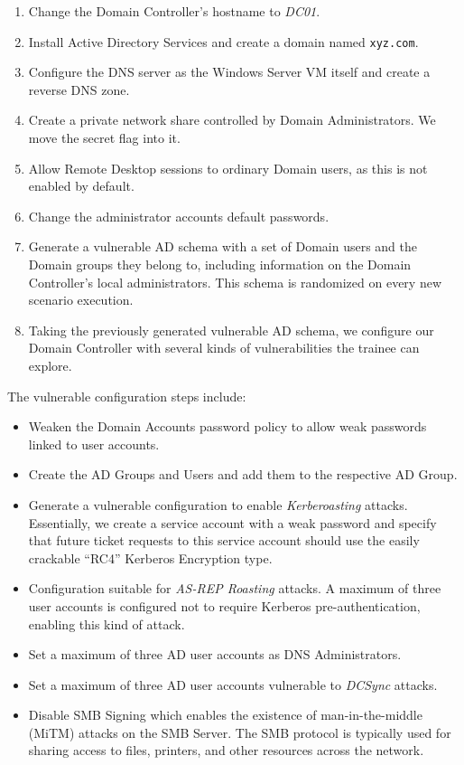\begin{enumerate}
    \item Change the Domain Controller's hostname to \textit{DC01}.
    \item Install Active Directory Services and create a domain named \texttt{xyz.com}.
    \item Configure the DNS server as the Windows Server VM itself and create a reverse DNS zone.
    \item Create a private network share controlled by Domain Administrators. We move the secret flag into it.
    \item Allow Remote Desktop sessions to ordinary Domain users, as this is not enabled by default.
    \item Change the administrator accounts default passwords.
    \item Generate a vulnerable AD schema with a set of Domain users and the Domain groups they belong to, including information on the Domain Controller's local administrators. This schema is randomized on every new scenario execution.
    \item Taking the previously generated vulnerable AD schema, we configure our Domain Controller with several kinds of vulnerabilities the trainee can explore.
\end{enumerate}

The vulnerable configuration steps include:

\begin{itemize}
    \item Weaken the Domain Accounts password policy to allow weak passwords linked to user accounts.
    \item Create the AD Groups and Users and add them to the respective AD Group.
    \item Generate a vulnerable configuration to enable \textit{Kerberoasting} attacks. Essentially, we create a service account with a weak password and specify that future ticket requests to this service account should use the easily crackable ``RC4'' Kerberos Encryption type.
    \item Configuration suitable for \textit{AS-REP Roasting} attacks. A maximum of three user accounts is configured not to require Kerberos pre-authentication, enabling this kind of attack.
    \item Set a maximum of three AD user accounts as DNS Administrators.
    \item Set a maximum of three AD user accounts vulnerable to \textit{DCSync} attacks.
    \item Disable SMB Signing which enables the existence of man-in-the-middle (MiTM) attacks on the SMB Server. The SMB protocol is typically used for sharing access to files, printers, and other resources across the network.
\end{itemize}

